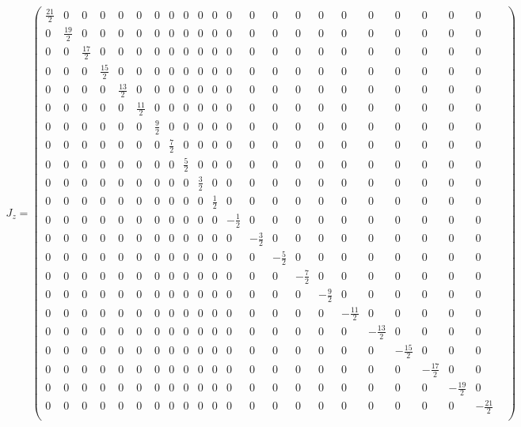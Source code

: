 \documentclass[10pt,a4paper]{article}
\begin{document}
\begin{align}
J_z = \begin{pmatrix}
\frac{21}{2}&0&0&0&0&0&0&0&0&0&0&0&0&0&0&0&0&0&0&0&0&0&\\0&\frac{19}{2}&0&0&0&0&0&0&0&0&0&0&0&0&0&0&0&0&0&0&0&0&\\0&0&\frac{17}{2}&0&0&0&0&0&0&0&0&0&0&0&0&0&0&0&0&0&0&0&\\0&0&0&\frac{15}{2}&0&0&0&0&0&0&0&0&0&0&0&0&0&0&0&0&0&0&\\0&0&0&0&\frac{13}{2}&0&0&0&0&0&0&0&0&0&0&0&0&0&0&0&0&0&\\0&0&0&0&0&\frac{11}{2}&0&0&0&0&0&0&0&0&0&0&0&0&0&0&0&0&\\0&0&0&0&0&0&\frac{9}{2}&0&0&0&0&0&0&0&0&0&0&0&0&0&0&0&\\0&0&0&0&0&0&0&\frac{7}{2}&0&0&0&0&0&0&0&0&0&0&0&0&0&0&\\0&0&0&0&0&0&0&0&\frac{5}{2}&0&0&0&0&0&0&0&0&0&0&0&0&0&\\0&0&0&0&0&0&0&0&0&\frac{3}{2}&0&0&0&0&0&0&0&0&0&0&0&0&\\0&0&0&0&0&0&0&0&0&0&\frac{1}{2}&0&0&0&0&0&0&0&0&0&0&0&\\0&0&0&0&0&0&0&0&0&0&0&-\frac{1}{2}&0&0&0&0&0&0&0&0&0&0&\\0&0&0&0&0&0&0&0&0&0&0&0&-\frac{3}{2}&0&0&0&0&0&0&0&0&0&\\0&0&0&0&0&0&0&0&0&0&0&0&0&-\frac{5}{2}&0&0&0&0&0&0&0&0&\\0&0&0&0&0&0&0&0&0&0&0&0&0&0&-\frac{7}{2}&0&0&0&0&0&0&0&\\0&0&0&0&0&0&0&0&0&0&0&0&0&0&0&-\frac{9}{2}&0&0&0&0&0&0&\\0&0&0&0&0&0&0&0&0&0&0&0&0&0&0&0&-\frac{11}{2}&0&0&0&0&0&\\0&0&0&0&0&0&0&0&0&0&0&0&0&0&0&0&0&-\frac{13}{2}&0&0&0&0&\\0&0&0&0&0&0&0&0&0&0&0&0&0&0&0&0&0&0&-\frac{15}{2}&0&0&0&\\0&0&0&0&0&0&0&0&0&0&0&0&0&0&0&0&0&0&0&-\frac{17}{2}&0&0&\\0&0&0&0&0&0&0&0&0&0&0&0&0&0&0&0&0&0&0&0&-\frac{19}{2}&0&\\0&0&0&0&0&0&0&0&0&0&0&0&0&0&0&0&0&0&0&0&0&-\frac{21}{2}&\\\end{pmatrix}\end{align}
\end{document}
